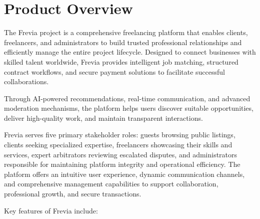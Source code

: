 \section{Product Overview}

The Frevia project is a comprehensive freelancing platform that enables clients, freelancers, and administrators to build trusted professional relationships and efficiently manage the entire project lifecycle. Designed to connect businesses with skilled talent worldwide, Frevia provides intelligent job matching, structured contract workflows, and secure payment solutions to facilitate successful collaborations.

Through AI-powered recommendations, real-time communication, and advanced moderation mechanisms, the platform helps users discover suitable opportunities, deliver high-quality work, and maintain transparent interactions.

Frevia serves five primary stakeholder roles: guests browsing public listings, clients seeking specialized expertise, freelancers showcasing their skills and services, expert arbitrators reviewing escalated disputes, and administrators responsible for maintaining platform integrity and operational efficiency. The platform offers an intuitive user experience, dynamic communication channels, and comprehensive management capabilities to support collaboration, professional growth, and secure transactions.

Key features of Frevia include:

